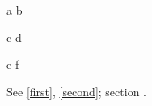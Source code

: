 \documentclass{article}
\begin{document}
\begin{ex}[first]
a b
\end{ex}
\begin{exx}[label=second]
c d
\end{exx}
\begin{exx}[step=section]
e f
\end{exx}
See \ref{first}, \ref{second}; section \thesection.
\end{document}
